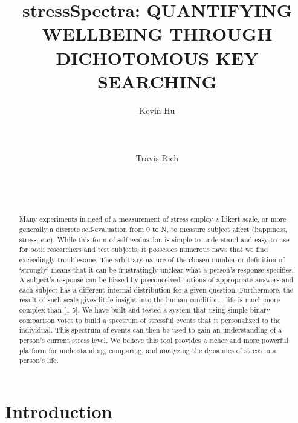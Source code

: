 \documentclass{sigchi}
\begin{document}
\title{stressSpectra: QUANTIFYING WELLBEING THROUGH DICHOTOMOUS KEY SEARCHING }

\author{
  \alignauthor Kevin Hu\\
    \\
    \\
    \\
  \alignauthor Travis Rich\\
    \\
    \\
    \\
}

\maketitle

\begin{abstract}
Many experiments in need of a measurement of stress employ a Likert scale, or more generally a discrete self-evaluation from 0 to N, to measure subject affect (happiness, stress, etc). While this form of self-evaluation is simple to understand and easy to use for both researchers and test subjects, it possesses numerous flaws that we find exceedingly troublesome. The arbitrary nature of the chosen number or definition of ‘strongly’ means that it can be frustratingly unclear what a person’s response specifies. A subject’s response can be biased by preconceived notions of appropriate answers and each subject has a different internal distribution for a given question. Furthermore, the result of such scale gives little insight into the human condition - life is much more complex than [1-5]. We have built and tested a system that using simple binary comparison votes to build a spectrum of stressful events that is personalized to the individual. This spectrum of events can then be used to gain an understanding of a person’s current stress level. We believe this tool provides a richer and more powerful platform for understanding, comparing, and analyzing the dynamics of stress in a person’s life. 
\end{abstract}


\section{Introduction}
\end{document}
